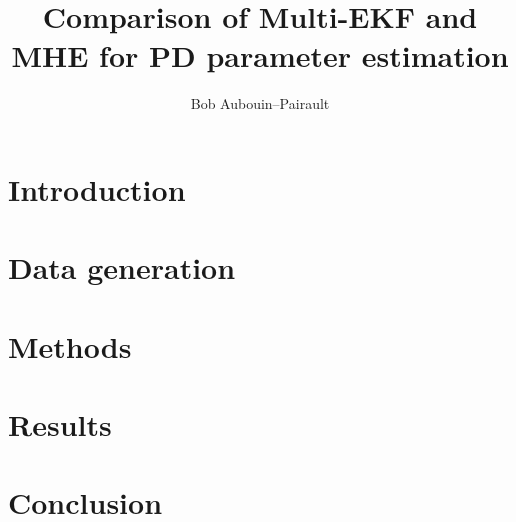 \documentclass[a4paper,12pt]{article}
\begin{document}
\title{Comparison of Multi-EKF and MHE for PD parameter estimation}

\author{Bob Aubouin--Pairault}
\maketitle



\section{Introduction}


\section{Data generation}


\section{Methods}


\section{Results}


\section{Conclusion}



\end{document}
